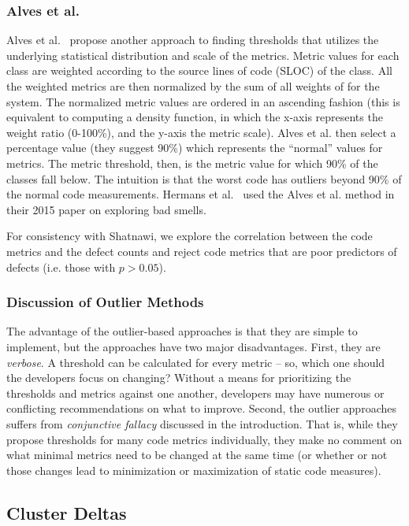 \documentclass[twocolumn,5p]{elsarticle}
\theoremstyle{break}
\begin{document}
	
	\subsubsection{ Alves et al.}
	Alves et al.~\cite{Alves2010} propose another approach 
	to finding thresholds that  utilizes the underlying statistical distribution and scale of the metrics. 
	Metric values for each class are weighted according to the source lines of code (SLOC) of the class. All the weighted metrics are then normalized by the sum of all weights of for the system. 
	The normalized metric values are ordered in an ascending fashion (this is equivalent to computing a density function, in which the x-axis represents the weight ratio (0-100\%), and the y-axis the metric scale).
	Alves et al. then select a percentage value (they suggest 90\%) which represents the ``normal'' values for metrics. The metric threshold, then, is the metric value for which 90\% of the classes fall below. The intuition  is that the worst code has outliers beyond 90\% of the normal code measurements. Hermans et al.~\cite{hermans15} used the
	Alves et al. method in their  2015 paper on
	exploring bad smells.
	
	For consistency with Shatnawi, we explore the correlation between the code metrics and the defect counts and  reject code metrics that are poor predictors of defects (i.e.   those  with $p > 0.05$).
	
	\subsubsection{Discussion of Outlier Methods}\label{sect:disc}
	The advantage of the outlier-based
	approaches is that they are simple to implement, but the approaches have   two  major disadvantages. 
	First, they are {\em verbose}. A threshold can be calculated for every metric -- so, which one should the developers focus on changing? Without a means for prioritizing the  thresholds and metrics against one another, developers may have numerous or conflicting recommendations on what to improve. Second, the outlier approaches suffers from {\em conjunctive fallacy}  discussed in the introduction. That is, while	they propose thresholds for many code metrics
	individually, they make no comment on what minimal metrics need to be changed at the same time (or whether or not those changes lead to minimization or maximization of static code measures).
	
	
	\subsection{Cluster Deltas}
	
\end{document}
